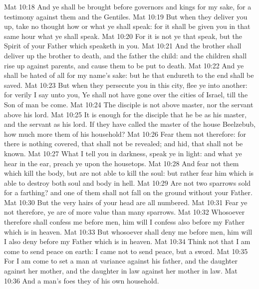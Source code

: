 \vs Mat 10:18 And ye shall be brought before governors and kings for my sake, for a testimony against them and the Gentiles.
\vs Mat 10:19 But when they deliver you up, take no thought how or what ye shall speak: for it shall be given you in that same hour what ye shall speak.
\vs Mat 10:20 For it is not ye that speak, but the Spirit of your Father which speaketh in you.
\vs Mat 10:21 And the brother shall deliver up the brother to death, and the father the child: and the children shall rise up against  parents, and cause them to be put to death.
\vs Mat 10:22 And ye shall be hated of all  for my name's sake: but he that endureth to the end shall be saved.
\vs Mat 10:23 But when they persecute you in this city, flee ye into another: for verily I say unto you, Ye shall not have gone over the cities of Israel, till the Son of man be come.
\vs Mat 10:24 The disciple is not above  master, nor the servant above his lord.
\vs Mat 10:25 It is enough for the disciple that he be as his master, and the servant as his lord. If they have called the master of the house Beelzebub, how much more  them of his household?
\vs Mat 10:26 Fear them not therefore: for there is nothing covered, that shall not be revealed; and hid, that shall not be known.
\vs Mat 10:27 What I tell you in darkness,  speak ye in light: and what ye hear in the ear,  preach ye upon the housetops.
\vs Mat 10:28 And fear not them which kill the body, but are not able to kill the soul: but rather fear him which is able to destroy both soul and body in hell.
\vs Mat 10:29 Are not two sparrows sold for a farthing? and one of them shall not fall on the ground without your Father.
\vs Mat 10:30 But the very hairs of your head are all numbered.
\vs Mat 10:31 Fear ye not therefore, ye are of more value than many sparrows.
\vs Mat 10:32 Whosoever therefore shall confess me before men, him will I confess also before my Father which is in heaven.
\vs Mat 10:33 But whosoever shall deny me before men, him will I also deny before my Father which is in heaven.
\vs Mat 10:34 Think not that I am come to send peace on earth: I came not to send peace, but a sword.
\vs Mat 10:35 For I am come to set a man at variance against his father, and the daughter against her mother, and the daughter in law against her mother in law.
\vs Mat 10:36 And a man's foes  they of his own household.
